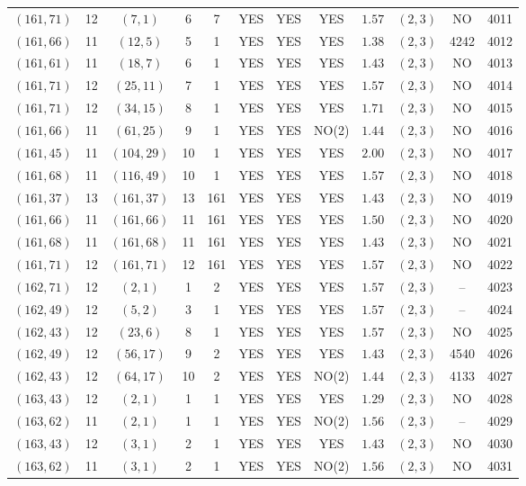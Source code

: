 \begin{longtable}{|c|c|c|c|c|c|c|c|c|c|c|c|}
$(161,71)$ & 12 & $(7,1)$ & 6 & 7 & YES & YES & YES & $1.57$ & $(2,3)$ & NO & 4011\\
$(161,66)$ & 11 & $(12,5)$ & 5 & 1 & YES & YES & YES & $1.38$ & $(2,3)$ & 4242 & 4012\\
$(161,61)$ & 11 & $(18,7)$ & 6 & 1 & YES & YES & YES & $1.43$ & $(2,3)$ & NO & 4013\\
$(161,71)$ & 12 & $(25,11)$ & 7 & 1 & YES & YES & YES & $1.57$ & $(2,3)$ & NO & 4014\\
$(161,71)$ & 12 & $(34,15)$ & 8 & 1 & YES & YES & YES & $1.71$ & $(2,3)$ & NO & 4015\\
$(161,66)$ & 11 & $(61,25)$ & 9 & 1 & YES & YES & NO(2) & $1.44$ & $(2,3)$ & NO & 4016\\
$(161,45)$ & 11 & $(104,29)$ & 10 & 1 & YES & YES & YES & $2.00$ & $(2,3)$ & NO & 4017\\
$(161,68)$ & 11 & $(116,49)$ & 10 & 1 & YES & YES & YES & $1.57$ & $(2,3)$ & NO & 4018\\
$(161,37)$ & 13 & $(161,37)$ & 13 & 161 & YES & YES & YES & $1.43$ & $(2,3)$ & NO & 4019\\
$(161,66)$ & 11 & $(161,66)$ & 11 & 161 & YES & YES & YES & $1.50$ & $(2,3)$ & NO & 4020\\
$(161,68)$ & 11 & $(161,68)$ & 11 & 161 & YES & YES & YES & $1.43$ & $(2,3)$ & NO & 4021\\
$(161,71)$ & 12 & $(161,71)$ & 12 & 161 & YES & YES & YES & $1.57$ & $(2,3)$ & NO & 4022\\
$(162,71)$ & 12 & $(2,1)$ & 1 & 2 & YES & YES & YES & $1.57$ & $(2,3)$ & -- & 4023\\
$(162,49)$ & 12 & $(5,2)$ & 3 & 1 & YES & YES & YES & $1.57$ & $(2,3)$ & -- & 4024\\
$(162,43)$ & 12 & $(23,6)$ & 8 & 1 & YES & YES & YES & $1.57$ & $(2,3)$ & NO & 4025\\
$(162,49)$ & 12 & $(56,17)$ & 9 & 2 & YES & YES & YES & $1.43$ & $(2,3)$ & 4540 & 4026\\
$(162,43)$ & 12 & $(64,17)$ & 10 & 2 & YES & YES & NO(2) & $1.44$ & $(2,3)$ & 4133 & 4027\\
$(163,43)$ & 12 & $(2,1)$ & 1 & 1 & YES & YES & YES & $1.29$ & $(2,3)$ & NO & 4028\\
$(163,62)$ & 11 & $(2,1)$ & 1 & 1 & YES & YES & NO(2) & $1.56$ & $(2,3)$ & -- & 4029\\
$(163,43)$ & 12 & $(3,1)$ & 2 & 1 & YES & YES & YES & $1.43$ & $(2,3)$ & NO & 4030\\
$(163,62)$ & 11 & $(3,1)$ & 2 & 1 & YES & YES & NO(2) & $1.56$ & $(2,3)$ & NO & 4031\\

\end{longtable}
